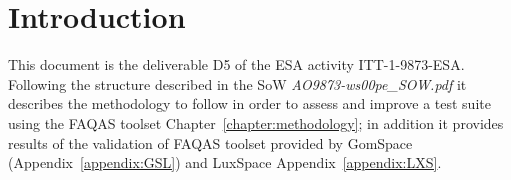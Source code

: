 
\chapter*{Introduction}
\label{sec:introduction}

This document is the deliverable D5 of the ESA activity ITT-1-9873-ESA. Following the structure described in the SoW \emph{AO9873-ws00pe\_SOW.pdf} it describes the methodology to follow in order to assess and improve a test suite using the FAQAS toolset Chapter~\ref{chapter:methodology}; in addition it provides results of the validation of FAQAS toolset provided by GomSpace (Appendix~\ref{appendix:GSL}) and LuxSpace Appendix~\ref{appendix:LXS}.
 
